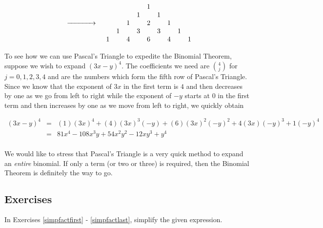 \[\begin{array}{ccc}
\begin{array}{ccccccccc}
\end{array}

&

\xrightarrow{\hspace{.5in}}

&


\begin{array}{ccccccccc} 
&	&	&	&	1	&	&	&	&	\\ 
&	&	&	1	&	&	1	&	&	&\\
&	&	1	&	& 2	&	&1	&	&\\ 
&	1	&	&	3	&	& 3	&	&	1	&	\\ 
1	&	&	4	&	&	6	&	&	4 &	&	1 \\ 

\end{array} \\

\end{array} \]

\smallskip

To see how we can use Pascal's Triangle to expedite the Binomial Theorem, suppose we wish to expand $(3x-y)^{4}$.  The coefficients we need are $\binom{4}{j}$ for $j = 0, 1, 2, 3, 4$ and are the numbers which form the fifth row of Pascal's Triangle. Since we know that the exponent of $3x$ in the first term is $4$ and then decreases by one as we go from left to right while the exponent of $-y$ starts at $0$ in the first term and then increases by one as we move from left to right, we quickly obtain
 
\[ \begin{array}{rcl}

(3x-y)^{4} & = & (1)(3x)^{4} + (4)(3x)^3(-y) + (6)(3x)^2(-y)^2 + 4(3x)(-y)^3 + 1(-y)^4 \\
           & = & 81x^4 - 108x^3y + 54x^2y^2 -12xy^3 + y^4 \\
\end{array} \]

We would like to stress that Pascal's Triangle is a very quick method to expand an \textit{entire} binomial.  If only a term (or two or three) is required, then the Binomial Theorem is definitely the way to go.  

\newpage

\subsection{Exercises}

In Exercises \ref{simpfactfirst} - \ref{simpfactlast},  simplify the given expression.

